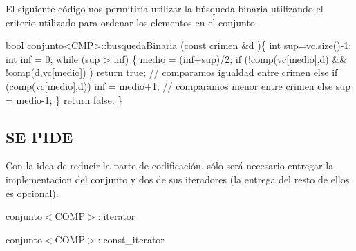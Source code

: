 El siguiente código nos permitiría utilizar la búsqueda binaria utilizando el criterio utilizado para ordenar los elementos en el conjunto. 
\begin{DoxyCode}
\textcolor{keywordtype}{bool} conjunto<CMP>::busquedaBinaria (\textcolor{keyword}{const} crimen &d )\{
    \textcolor{keywordtype}{int} sup=vc.size()-1;
    \textcolor{keywordtype}{int} inf = 0;
    \textcolor{keywordflow}{while} (sup > inf) \{
      medio = (inf+sup)/2;
      \textcolor{keywordflow}{if} (!comp(vc[medio],d) && !comp(d,vc[medio]) ) \textcolor{keywordflow}{return} \textcolor{keyword}{true};  \textcolor{comment}{// comparamos igualdad entre crimen}
      \textcolor{keywordflow}{else} \textcolor{keywordflow}{if} (comp(vc[medio],d)) inf = medio+1; \textcolor{comment}{// comparamos menor entre crimen}
      \textcolor{keywordflow}{else} sup = medio-1;
    \}
    \textcolor{keywordflow}{return} \textcolor{keyword}{false};
\}
\end{DoxyCode}
\hypertarget{index_SP2}{}\subsection{S\-E P\-I\-D\-E}\label{index_SP2}
Con la idea de reducir la parte de codificación, sólo será necesario entregar la implementacion del conjunto y dos de sus iteradores (la entrega del resto de ellos es opcional). \begin{DoxyItemize}
\item conjunto$<$\-C\-O\-M\-P$>$\-::iterator \item conjunto$<$\-C\-O\-M\-P$>$\-::const\-\_\-iterator\end{DoxyItemize}
